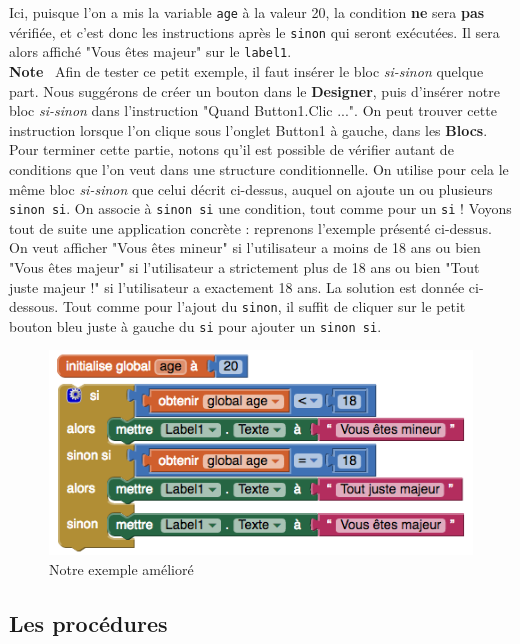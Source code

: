 \documentclass[12t,a4paper]{article}
\begin{document}
Ici, puisque l'on a mis la variable \texttt{age} à la valeur 20, la condition \textbf{ne} sera \textbf{pas} vérifiée, et c'est donc les instructions après le \texttt{sinon} qui seront exécutées. Il sera alors affiché "Vous êtes majeur" sur le \texttt{label1}. \\

\textbf{Note}~ Afin de tester ce petit exemple, il faut insérer le bloc \textit{si-sinon} quelque part. Nous suggérons de créer un bouton dans le \textbf{Designer}, puis d'insérer notre bloc \textit{si-sinon} dans l'instruction "Quand Button1.Clic ...". On peut trouver cette instruction lorsque l'on clique sous l'onglet Button1 à gauche, dans les \textbf{Blocs}. \\

Pour terminer cette partie, notons qu'il est possible de vérifier autant de conditions que l'on veut dans une structure conditionnelle. On utilise pour cela le même bloc \textit{si-sinon} que celui décrit ci-dessus, auquel on ajoute un ou plusieurs \texttt{sinon si}. On associe à \texttt{sinon si} une condition, tout comme pour un \texttt{si} ! Voyons tout de suite une application concrète : reprenons l'exemple présenté ci-dessus. On veut afficher "Vous êtes mineur" si l'utilisateur a moins de 18 ans ou bien "Vous êtes majeur" si l'utilisateur a strictement plus de 18 ans ou bien "Tout juste majeur !" si l'utilisateur a exactement 18 ans. La solution est donnée ci-dessous. Tout comme pour l'ajout du \texttt{sinon}, il suffit de cliquer sur le petit bouton bleu juste à gauche du \texttt{si} pour ajouter un \texttt{sinon si}.

\begin{figure}[h!]
\centering
\includegraphics[scale=0.6]{exemple-elseif}
\caption{Notre exemple amélioré}
\label{exemple-elseif}
\end{figure}


\subsection{Les procédures}
\end{document}
